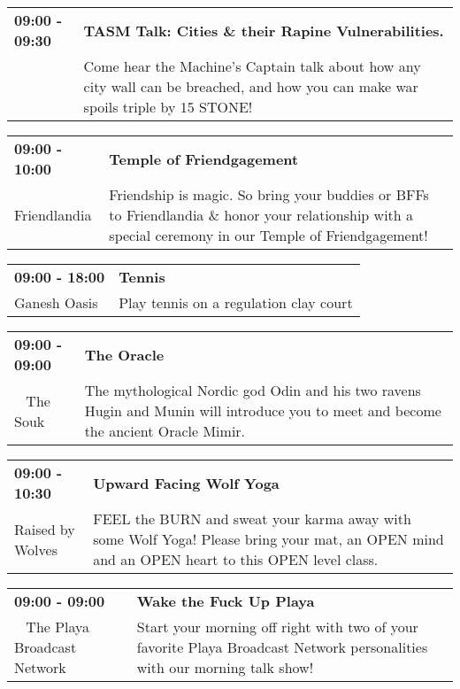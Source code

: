 \begin{tabular}{ p{1in} p{2.2in} }
    \textbf{09:00 - 09:30} & \textbf{TASM Talk: Cities \& their Rapine Vulnerabilities.} \\
    ~ \newline  & Come hear the Machine's Captain talk about how any city wall can be breached, and how you can make war spoils triple by 15 STONE! \\
    \hline 
\end{tabular}
    
\begin{tabular}{ p{1in} p{2.2in} }
    \textbf{09:00 - 10:00} & \textbf{Temple of Friendgagement} \\
    Friendlandia \newline  & Friendship is magic. So bring your buddies or BFFs to Friendlandia \& honor your relationship with a special ceremony in our Temple of Friendgagement! \\
    \hline 
\end{tabular}
    
\begin{tabular}{ p{1in} p{2.2in} }
    \textbf{09:00 - 18:00} & \textbf{Tennis} \\
    Ganesh Oasis \newline  & Play tennis on a regulation clay court \\
    \hline 
\end{tabular}
    
\begin{tabular}{ p{1in} p{2.2in} }
    \textbf{09:00 - 09:00} & \textbf{The Oracle} \\
    ~ \newline The Souk & The mythological Nordic god Odin and his two ravens Hugin and Munin will introduce you to meet and become the ancient Oracle Mimir. \\
    \hline 
\end{tabular}
    
\begin{tabular}{ p{1in} p{2.2in} }
    \textbf{09:00 - 10:30} & \textbf{Upward Facing Wolf Yoga} \\
    Raised by Wolves \newline  & FEEL the BURN and sweat your karma away with some Wolf Yoga! Please bring your mat, an OPEN mind and an OPEN heart to this OPEN level class. \\
    \hline 
\end{tabular}
    
\begin{tabular}{ p{1in} p{2.2in} }
    \textbf{09:00 - 09:00} & \textbf{Wake the Fuck Up Playa} \\
    ~ \newline The Playa Broadcast Network & Start your morning off right with two of your favorite Playa Broadcast Network personalities with our morning talk show! \\
    \hline 
\end{tabular}
    
